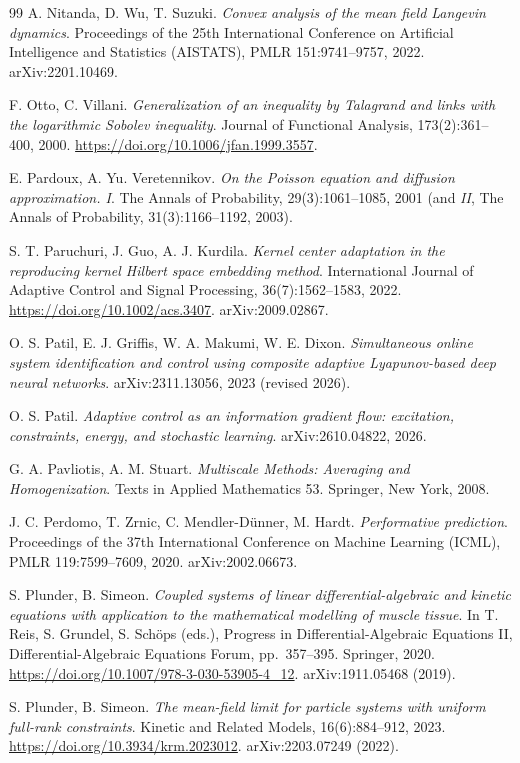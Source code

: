 \begin{thebibliography}{99}
A. Nitanda, D. Wu, T. Suzuki.
\emph{Convex analysis of the mean field Langevin dynamics}.
Proceedings of the 25th International Conference on Artificial Intelligence and Statistics (AISTATS),
PMLR 151:9741--9757, 2022.
arXiv:2201.10469.

F. Otto, C. Villani.
\emph{Generalization of an inequality by Talagrand and links with the logarithmic Sobolev inequality}.
Journal of Functional Analysis, 173(2):361--400, 2000.
\url{https://doi.org/10.1006/jfan.1999.3557}.

E. Pardoux, A. Yu. Veretennikov.
\emph{On the Poisson equation and diffusion approximation. I}.
The Annals of Probability, 29(3):1061--1085, 2001
(and \emph{II}, The Annals of Probability, 31(3):1166--1192, 2003).

S. T. Paruchuri, J. Guo, A. J. Kurdila.
\emph{Kernel center adaptation in the reproducing kernel Hilbert space embedding method}.
International Journal of Adaptive Control and Signal Processing, 36(7):1562--1583, 2022.
\url{https://doi.org/10.1002/acs.3407}.
arXiv:2009.02867.

O. S. Patil, E. J. Griffis, W. A. Makumi, W. E. Dixon.
\emph{Simultaneous online system identification and control using composite adaptive Lyapunov-based deep neural
networks}.
arXiv:2311.13056, 2023 (revised 2026).

O. S. Patil.
\emph{Adaptive control as an information gradient flow: excitation, constraints, energy, and stochastic learning}.
arXiv:2610.04822, 2026.

G. A. Pavliotis, A. M. Stuart.
\emph{Multiscale Methods: Averaging and Homogenization}.
Texts in Applied Mathematics 53. Springer, New York, 2008.

J. C. Perdomo, T. Zrnic, C. Mendler-D\"unner, M. Hardt.
\emph{Performative prediction}.
Proceedings of the 37th International Conference on Machine Learning (ICML), PMLR 119:7599--7609, 2020.
arXiv:2002.06673.

S. Plunder, B. Simeon.
\emph{Coupled systems of linear differential-algebraic and kinetic equations with application to the mathematical
modelling of muscle tissue}.
In T. Reis, S. Grundel, S. Sch\"ops (eds.), Progress in Differential-Algebraic Equations II, Differential-Algebraic
Equations Forum, pp.~357--395. Springer, 2020.
\url{https://doi.org/10.1007/978-3-030-53905-4_12}.
arXiv:1911.05468 (2019).

S. Plunder, B. Simeon.
\emph{The mean-field limit for particle systems with uniform full-rank constraints}.
Kinetic and Related Models, 16(6):884--912, 2023.
\url{https://doi.org/10.3934/krm.2023012}.
arXiv:2203.07249 (2022).


\end{thebibliography}
